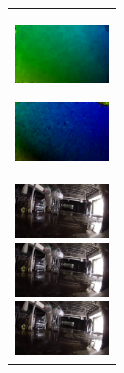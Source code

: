 \begin{enumerate}
\begin{end}
\begin{figure}[htbp]
\begin{tabular}{l}
      \begin{minipage}{0.165\hsize}
        \begin{center}
          \includegraphics[clip, width=2.5cm]{./Figures/optic_stop1-4.eps}
          \hspace{0.1cm} { }
        \end{center}
      \end{minipage}
      \begin{minipage}{0.165\hsize}
        \begin{center}
          \includegraphics[clip, width=2.5cm]{./Figures/optic_stop1-5.eps}
          \hspace{2.2cm} { }
        \end{center}
      \end{minipage}
\\ %
      \begin{minipage}{0.165\hsize}
        \begin{center}
          \includegraphics[clip, width=2.5cm]{./Figures/still_stop2-1.eps}
        \end{center}
      \end{minipage}
      \begin{minipage}{0.165\hsize}
        \begin{center}
          \includegraphics[clip, width=2.5cm]{./Figures/still_stop2-2.eps}
        \end{center}
      \end{minipage}
      \begin{minipage}{0.165\hsize}
        \begin{center}
          \includegraphics[clip, width=2.5cm]{./Figures/still_stop2-3.eps}

\end{center}
\end{minipage}
\end{tabular}
\end{figure}
\end{end}
\end{enumerate}

